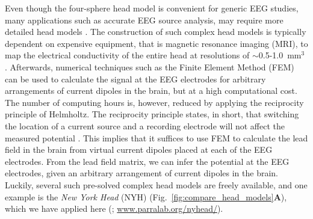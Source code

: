 \documentclass[preprint,10pt,authoryear]{elsarticle}
\newcommand{\hlb}[2][NavyBlue]{ {\sethlcolor{#1} \hl{#2}} }
\newcommand{\hlg}[2][Emerald]{ {\sethlcolor{#1} \hl{#2}} }
\newcommand{\hlp}[2][Purple]{ {\sethlcolor{#1} \hl{#2}} }
\newcommand{\snnote}[1]{\color{white}{\hlb{SN: #1 }}\color{black}}
\newcommand{\sntxt}[1]{{\color{NavyBlue}#1}}
\newcommand{\tvnnote}[1]{\color{white}{\hlg{TVN: #1 }}\color{black}}
\newcommand{\gen}[1]{\color{white}{\hlp{GTE: #1 }}\color{black}}
\begin{document}
Even though the four-sphere head model is convenient for generic EEG studies, many applications such as accurate EEG source analysis, may require more detailed head models \citep{DALE1999, VORWERK2014}.
The construction of such complex head models is typically dependent on expensive equipment, %
that is magnetic resonance imaging (MRI), to map the electrical conductivity of the entire head at resolutions of $\sim$0.5-1.0~mm$^3$
\citep{HUANG2015, HUANG2016}. Afterwards, numerical techniques such as the Finite Element Method (FEM) \citep{LOGG2012} can be used to calculate the signal at the EEG electrodes for arbitrary arrangements of current dipoles in the brain, but at a high computational cost.
The number of computing hours is, however, reduced by applying the reciprocity principle of Helmholtz. The reciprocity principle states, in short, that switching the location of a current source and a recording electrode will not affect the measured potential \citep{Malmivuo1995, Ziegler2014, HUANG2016, Dmochowski2017}. %
 This implies that it suffices to use FEM to calculate the lead field in the brain from virtual current dipoles placed at each of the EEG electrodes. From the lead field matrix, we can infer the potential at the EEG electrodes, given an arbitrary arrangement of current dipoles in the brain.
Luckily, %
several such pre-solved complex head models are freely available, and one example is the {\it New York Head} (NYH) (Fig.~\ref{fig:compare_head_models}\textbf{A}), which we have applied here (\cite{HUANG2016}; \url{www.parralab.org/nyhead/}).
\end{document}
